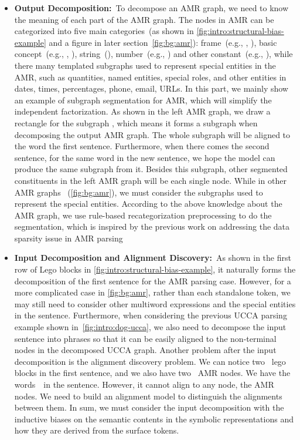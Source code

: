 {\begin{itemize}
\item \textbf{Output Decomposition:}~To decompose an AMR graph, we
  need to know the meaning of each part of the AMR graph. The nodes in
  AMR can be categorized into five main categories~(as shown in
  \autoref{fig:intro:structural-bias-example} and a figure in later
  section~\autoref{fig:bg:amr}): frame~(e.g., ,
  ), basic concept~(e.g., ,
  ), string~(), number~(e.g.,
  ) and other constant~(e.g., \tquoted{-}), while there
  many templated subgraphs used to represent special entities in the
  AMR, such as quantities, named entities, special roles, and other
  entities in dates, times, percentages, phone, email, URLs. In this
  part, we mainly show an example of subgraph segmentation for AMR,
  which will simplify the independent factorization. As shown in the
  left AMR graph, we draw a rectangle for the subgraph
  , which means it forms a subgraph
  when decomposing the output AMR graph. The whole subgraph will be
  aligned to the word  the first
  sentence. Furthermore, when there comes the second sentence, for the
  same word  in the new sentence, we hope the model
  can produce the same subgraph 
  from it. Besides this subgraph, other segmented constituents in the
  left AMR graph will be each single node. While in other AMR graphs
  ~(\autoref{fig:bg:amr}), we must consider the subgraphs used to
  represent the special entities. According to the above knowledge
  about the AMR graph, we use rule-based recategorization
  preprocessing to do the segmentation, which is inspired by the
  previous work on addressing the data sparsity issue in AMR
  parsing~\citep{Werling:2015up,foland-martin-2017-abstract,Wang:2017vt,Peng:2017ud}

\item \textbf{Input Decomposition and Alignment Discovery:}~As shown
  in the first row of Lego blocks in
  \autoref{fig:intro:structural-bias-example}, it naturally forms the
  decomposition of the first sentence for the AMR parsing
  case. However, for a more complicated case in \autoref{fig:bg:amr},
  rather than each standalone token, we may still need to consider
  other multiword expressions and the special entities in the
  sentence. Furthermore, when considering the previous UCCA parsing
  example shown in~\autoref{fig:intro:dog-ucca}, we also need to
  decompose the input sentence into phrases so that it can be easily
  aligned to the non-terminal nodes in the decomposed UCCA graph.
  Another problem after the input decomposition is the alignment
  discovery problem. We can notice two ~lego blocks in
  the first sentence, and we also have two ~AMR nodes. We
  have the words~~in the sentence. However, it cannot
  align to any node, the AMR nodes. We need to build an alignment
  model to distinguish the alignments between them. In sum, we must
  consider the input decomposition with the inductive biases on the
  semantic contents in the symbolic representations and how they are
  derived from the surface tokens.


\end{itemize}}
